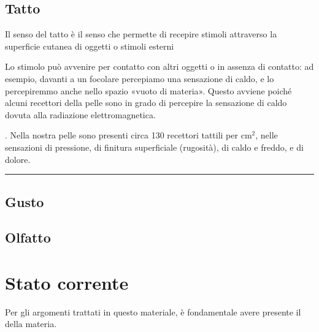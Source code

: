 \documentclass[letterpaper,10pt,italian]{jupyterBook}
\begin{document}
\sphinxstepscope


\section{Tatto}
\label{\detokenize{ch/intro/sensing-tactile:tatto}}\label{\detokenize{ch/intro/sensing-tactile:physics-hs-intro-sensing-tactile}}\label{\detokenize{ch/intro/sensing-tactile::doc}}
\sphinxAtStartPar
Il senso del tatto è il senso che permette di recepire stimoli attraverso la superficie cutanea di oggetti o stimoli esterni%
\begin{footnote}[1]\sphinxAtStartFootnote
Lo stimolo può avvenire per contatto con altri oggetti o in assenza di contatto: ad esempio, davanti a un focolare percepiamo una sensazione di caldo, e lo percepiremmo anche nello spazio «vuoto di materia». Questo avviene poiché alcuni recettori della pelle sono in grado di percepire la sensazione di caldo dovuta alla radiazione elettromagnetica.
%
\end{footnote}. Nella nostra pelle sono presenti circa 130 recettori tattili per \(\text{cm}^2\),  nelle sensazioni di pressione, di finitura superficiale (rugosità), di caldo e freddo, e di dolore.


\bigskip\hrule\bigskip


\sphinxstepscope


\section{Gusto}
\label{\detokenize{ch/intro/sensing-taste:gusto}}\label{\detokenize{ch/intro/sensing-taste:physics-hs-intro-sensing-taste}}\label{\detokenize{ch/intro/sensing-taste::doc}}
\sphinxstepscope


\section{Olfatto}
\label{\detokenize{ch/intro/sensing-smell:olfatto}}\label{\detokenize{ch/intro/sensing-smell:physics-hs-intro-sensing-smell}}\label{\detokenize{ch/intro/sensing-smell::doc}}
\sphinxstepscope


\chapter{Stato corrente}
\label{\detokenize{ch/intro/current-status:stato-corrente}}\label{\detokenize{ch/intro/current-status:physics-hs-intro-current-status}}\label{\detokenize{ch/intro/current-status::doc}}
\sphinxAtStartPar
{} Per gli argomenti trattati in questo materiale, è fondamentale avere presente il  della materia.
\end{document}
